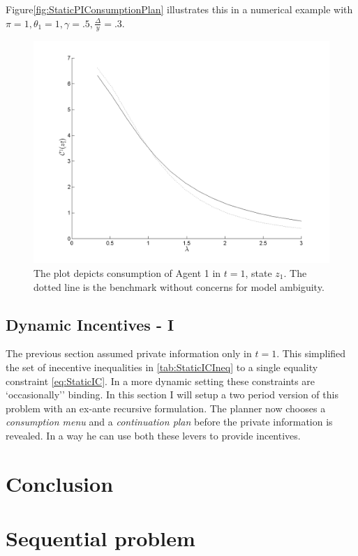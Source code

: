 \documentclass[12pt]{article}
\begin{document}
Figure{\ref{fig:StaticPIConsumptionPlan}} illustrates this in a numerical example with $\pi=1,\theta_1=1,\gamma=.5,\frac{\Delta}{y}=.3$.
\begin{figure}[htbp]
\centering
	  \includegraphics[scale=0.4]{Matlab/PrivateInformation/Plots/StaticPIConsumptionPlan.png}

	\caption{The plot depicts consumption of Agent 1 in $t=1$, state $z_1$. The dotted line is the benchmark without concerns for model ambiguity.}
	\label{fig:BondEconomyOucomes}
\end{figure} 
\subsection{Dynamic Incentives - I}
The previous section assumed private information only in $t=1$. This simplified the set of inecentive inequalities in \ref{tab:StaticICIneq} to a single equality constraint \ref{eq:StaticIC}. In a more dynamic setting these constraints are `occasionally'' binding. In this section I will setup a two period version of this problem with an ex-ante recursive formulation. The planner now chooses a \emph{consumption menu} and a \emph{continuation plan} before the private information is revealed. In a way he can use both these levers to provide incentives. 

\section{Conclusion}

\appendix
\section{Sequential problem}
\end{document}
